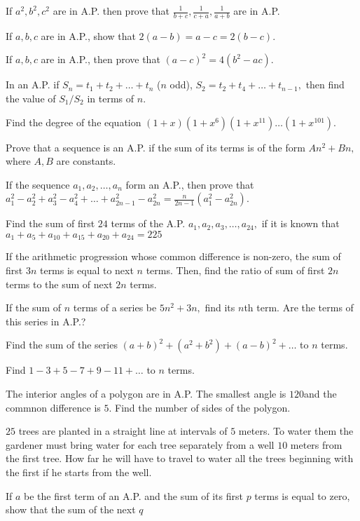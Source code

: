 \item If $a^2, b^2, c^2$ are in A.P. then prove that $\frac{1}{b+c}, \frac{1}{c+a}, \frac{1}{a + b}$ are in A.P.
\item If $a, b, c$ are in A.P., show that $2(a - b) = a - c = 2(b - c)$.
\item If $a, b , c$ are in A.P., then prove that $(a - c)^2 = 4(b^2 - ac)$.
\item In an A.P. if $S_n = t_1 + t_2 + \ldots + t_n$ ($n$ odd), $S_2 = t_2 + t_4 + \ldots + t_{n - 1},$ then find the value of
  $S_1/S_2$ in terms of $n$.
\item Find the degree of the equation $(1 + x)(1 + x^6)(1 + x^{11})\ldots (1+ x^{101})$.
\item Prove that a sequence is an A.P. if the sum of its terms is of the form $An^2 + Bn,$ where $A, B$ are constants.
\item If the sequence $a_1, a_2, \ldots, a_n$ form an A.P., then prove that $a_1^2 - a_2^2 + a_3^2 - a_4^2 + \ldots + a_{2n - 1}^2
  - a_{2n}^2 = \frac{n}{2n - 1}(a_1^2 - a_{2n}^2)$.
\item Find the sum of first $24$ terms of the A.P. $a_1, a_2, a_3, \ldots, a_{24},$ if it is known that $a_1 + a_5 + a_{10} +
  a_{15} + a_{20} + a_{24} = 225$
\item If the arithmetic progression whose common difference is non-zero, the sum of first $3n$ terms is equal to next $n$
  terms. Then, find the ratio of sum of first $2n$ terms to the sum of next $2n$ terms.
\item If the sum of $n$ terms of a series be $5n^2 + 3n,$ find its $n$th term. Are the terms of this series in A.P.?
\item Find the sum of the series $(a + b)^2 + (a^2 + b^2) + (a - b)^2 + \ldots$ to $n$ terms.
\item Find $1 - 3 + 5 - 7 + 9 - 11 + \ldots$ to $n$ terms.
\item The interior angles of a polygon are in A.P. The smallest angle is $120$\textdegree and the commnon difference is
  $5$\textdegree. Find the number of sides of the polygon.
\item $25$ trees are planted in a straight line at intervals of $5$ meters. To water them the gardener must bring water for each
  tree separately from a well $10$ meters from the first tree. How far he will have to travel to water all the trees beginning with
  the first if he starts from the well.
\item If $a$ be the first term of an A.P. and the sum of its first $p$ terms is equal to zero, show that the sum of the next $q$
